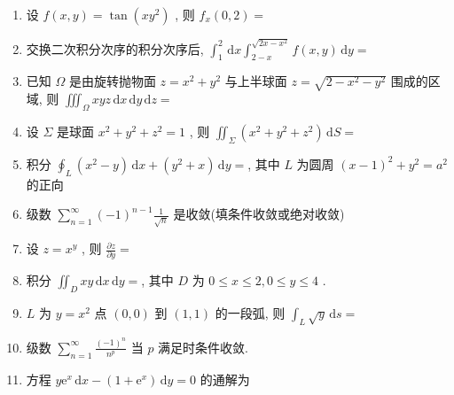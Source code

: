\documentclass[cn,11pt,fancy,hide]{elegantbook}
\newcommand{\ee}{\mathrm{e}}
\newcommand{\dd}{\,\mathrm{d}}
\renewcommand{\leq}{\leqslant}
\begin{document}
\begin{enumerate}
	\item 设 $f(x, y)=\tan \left(x y^{2}\right)$ , 则 $f_{x}(0,2)=$\underline{\hspace{8pc}}
	
	\item  交换二次积分次序的积分次序后, $\int_{1}^{2} \dd x \int_{2-x}^{\sqrt{2 x-x^{2}}} f(x, y) \dd y=$\underline{\hspace{8pc}}
	
	\item  已知 $\Omega$ 是由旋转抛物面 $z=x^{2}+y^{2}$ 与上半球面 $z=\sqrt{2-x^{2}-y^{2}}$ 围成的区域, 则 $\iiint_{\Omega} x y z \dd x \dd y \dd z=$\underline{\hspace{8pc}}
	
	\item  设 $\Sigma$ 是球面 $x^{2}+y^{2}+z^{2}=1$ , 则 $\iint_{\Sigma}\left(x^{2}+y^{2}+z^{2}\right) \dd S=$\underline{\hspace{8pc}}
	
	\item 积分 $\oint_{L}\left(x^{2}-y\right) \dd x+\left(y^{2}+x\right) \dd y=$\underline{\hspace{8pc}}, 其中 $L$ 为圆周 $(x-1)^{2}+y^{2}=a^{2}$ 的正向
	
	\item 级数 $\sum_{n=1}^{\infty}(-1)^{n-1} \frac{1}{\sqrt{n}}$ 是\underline{\hspace{8pc}}收敛(填条件收敛或绝对收敛)
	
	\item 设 $z=x^{y}$ , 则 $\frac{\partial z}{\partial y}=$\underline{\hspace{8pc}}
	
	\item 积分 $\iint_{D} x y \dd x \dd y=$\underline{\hspace{8pc}}, 其中 $D$ 为 $0 \leq x \leq 2, 0 \leq y \leq 4$ .
	
	\item $L$ 为 $y=x^2$ 点 $(0,0)$ 到 $(1,1)$ 的一段弧, 则 $\int_{L} \sqrt{y} \dd s=$\underline{\hspace{8pc}}
	
	\item 级数 $\sum_{n=1}^{\infty} \frac{(-1)^{n}}{n^{p}}$ 当 $p$ 满足\underline{\hspace{8pc}}时条件收敛.
	
	\item 方程 $y \ee^{x} \dd x-\left(1+\ee^{x}\right) \dd y=0$ 的通解为\underline{\hspace{8pc}}
\end{enumerate}
\end{document}
